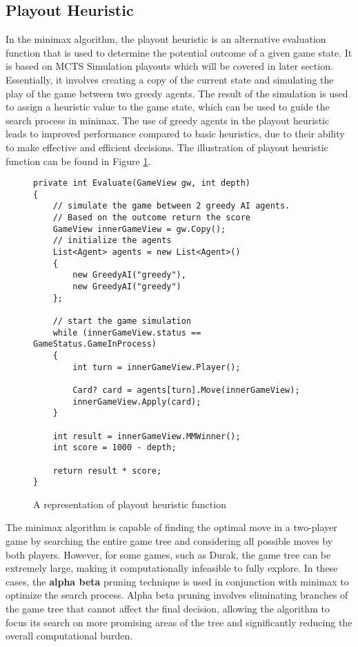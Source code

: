 \subsection{Playout Heuristic}

In the minimax algorithm, the playout heuristic is an alternative evaluation function that is used to determine the potential outcome of a given game state. It is based on MCTS Simulation playouts which will be covered in later section. Essentially, it involves creating a copy of the current state and simulating the play of the game between two greedy agents. The result of the simulation is used to assign a heuristic value to the game state, which can be used to guide the search process in minimax. The use of greedy agents in the playout heuristic leads to improved performance compared to basic heuristics, due to their ability to make effective and efficient decisions. The illustration of playout heuristic function can be found in Figure \ref{fig:playoutEval}.

\begin{figure}[h]
\captionsetup{justification=centering}
\begin{lstlisting}
private int Evaluate(GameView gw, int depth)
{
	// simulate the game between 2 greedy AI agents. 
	// Based on the outcome return the score
	GameView innerGameView = gw.Copy();
	// initialize the agents
	List<Agent> agents = new List<Agent>()
	{
		new GreedyAI("greedy"),
		new GreedyAI("greedy")
	};

	// start the game simulation
	while (innerGameView.status == GameStatus.GameInProcess)
	{
		int turn = innerGameView.Player();

		Card? card = agents[turn].Move(innerGameView);
		innerGameView.Apply(card);
	}

	int result = innerGameView.MMWinner();
	int score = 1000 - depth;

	return result * score;
}
\end{lstlisting}
\caption{A representation of playout heuristic function}
\label{fig:playoutEval}
\end{figure}

The minimax algorithm is capable of finding the optimal move in a two-player game by searching the entire game tree and considering all possible moves by both players. However, for some games, such as Durak, the game tree can be extremely large, making it computationally infeasible to fully explore. In these cases, the \textbf{alpha beta} pruning technique is used in conjunction with minimax to optimize the search process. Alpha beta pruning involves eliminating branches of the game tree that cannot affect the final decision, allowing the algorithm to focus its search on more promising areas of the tree and significantly reducing the overall computational burden.

